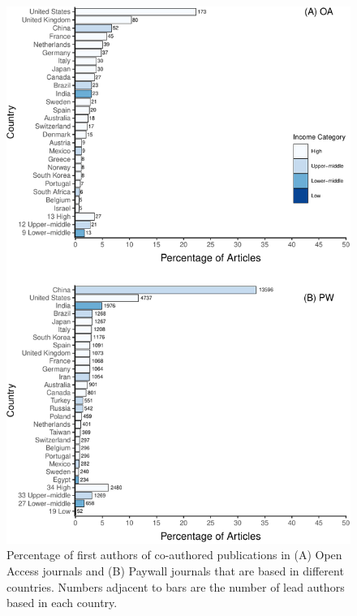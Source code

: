 \documentclass[english,man]{apa6}
\begin{document}
\begin{figure}

{\centering \includegraphics{Smith_etal_APC_ms_files/figure-latex/Fig2-1} 

}

\caption{Percentage of first authors of co-authored publications in (A) Open Access journals and (B) Paywall journals that are based in different countries. Numbers adjacent to bars are the number of lead authors based in each country.}\label{fig:Fig2}
\end{figure}
\end{document}
